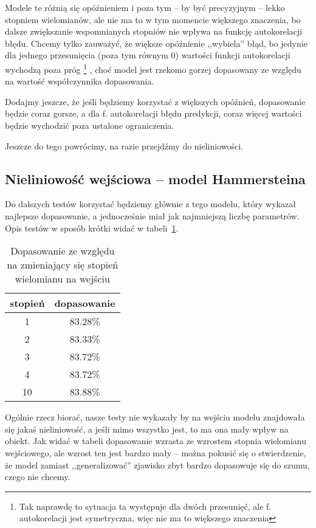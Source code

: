 \documentclass[11pt, a4paper]{article}
\begin{document}
Modele te różnią się opóźnieniem i poza tym -- by być precyzyjnym -- lekko stopniem wielomianów, ale nie ma to w tym momencie większego znaczenia, bo dalsze zwiększanie wspomnianych stopniów nie wpływa na funkcję autokorelacji błędu. Chcemy tylko zauważyć, że większe opóźnienie ,,wybiela'' błąd, bo jedynie dla jednego przesunięcia (poza tym równym 0) wartości funkcji autokorelacji wychodzą poza próg%
\footnote{Tak naprawdę to sytuacja ta występuje dla dwóch przesunięć, ale f. autokorelacji jest symetryczna, więc nie ma to większego znaczenia}
, choć model jest rzekomo gorzej dopasowany ze względu na wartość współczynnika dopasowania.

Dodajmy jeszcze, że jeśli będziemy korzystać z większych opóźnień, dopasowanie będzie coraz gorsze, a dla f. autokorelacji błędu predykcji, coraz więcej wartości będzie wychodzić poza ustalone ograniczenia.

Jeszcze do tego powrócimy, na razie przejdźmy do nieliniowości.

\subsection*{Nieliniowość wejściowa -- model Hammersteina}

Do dalszych testów korzystać będziemy głównie z tego modelu, który wykazał najlepsze dopasowanie, a jednocześnie miał jak najmniejszą liczbę parametrów. Opis testów w sposób krótki widać w tabeli~\ref{tbl:hammer}.
\begin{table}[htbp!]
	\centering
	\begin{tabular}{c||c}
		stopień & dopasowanie\\
		\hline\hline
		1 & 83.28\% \\
		\hline
		2 & 83.33\% \\
		\hline
		3 & 83.72\% \\
		\hline
		4 & 83.72\% \\
		\hline
		10 & 83.88\%
	\end{tabular}
	\caption{Dopasowanie ze względu na zmieniający się stopień wielomianu na wejściu}
	\label{tbl:hammer}
\end{table}

Ogólnie rzecz biorać, nasze testy nie wykazały by na wejściu modelu znajdowała się jakaś nieliniowość, a jeśli mimo wszystko jest, to ma ona mały wpływ na obiekt. Jak widać w tabeli dopasowanie wzrasta ze wzrostem stopnia wielomianu wejściowego, ale wzrost ten jest bardzo mały -- można pokusić się o stwierdzenie, że model zamiast ,,generalizować'' zjawisko zbyt bardzo dopasowuje się do szumu, czego nie chcemy.
\end{document}
